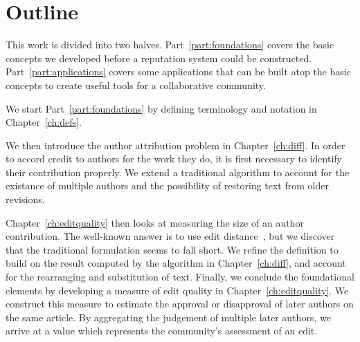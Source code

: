 \section{Outline}

This work is divided into two halves.
Part~\ref{part:foundations} covers the basic concepts we developed
before a reputation system could be constructed.
Part~\ref{part:applications} covers some applications that can
be built atop the basic concepts to create useful tools for
a collaborative community.

We start Part~\ref{part:foundations}
by defining terminology and notation in Chapter~\ref{ch:defs}.

We then introduce the author attribution problem in Chapter~\ref{ch:diff}.
In order to accord credit to authors for the work they do,
it is first necessary to identify their contribution properly.
We extend a traditional  algorithm to
account for the existance of multiple authors and the possibility
of restoring text from older revisions.

Chapter~\ref{ch:editquality} then looks at measuring the size of
an author contribution.
The well-known answer is to use edit distance~\cite{Levenshtein66},
but we discover that the traditional formulation seems to fall short.
We refine the definition to build on the result computed by the
algorithm in Chapter~\ref{ch:diff}, and account for the rearranging
and substitution of text.
Finally, we conclude the foundational elements by developing a measure
of edit quality in Chapter~\ref{ch:editquality}.
We construct this measure to estimate the approval or disapproval of
later authors on the same article.
By aggregating the judgement of multiple later authors, we arrive at
a value which represents the community's assessment of an edit.


